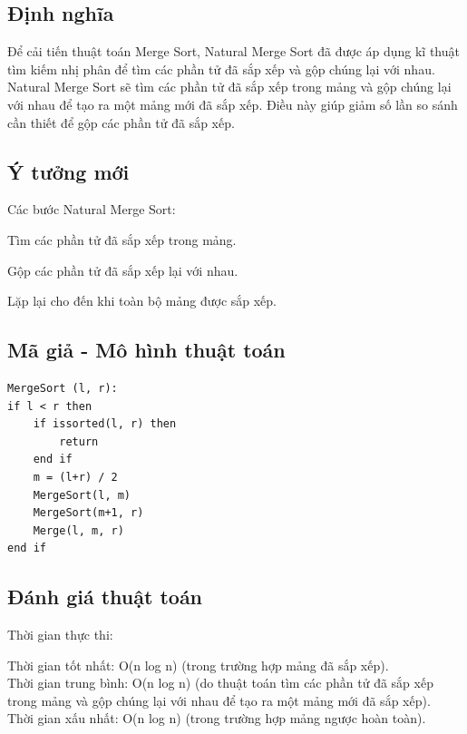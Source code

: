 \documentclass[12pt,a4paper]{report}
\begin{document}
\subsection{ Định nghĩa}

{\large \hspace{1cm} Để cải tiến thuật toán Merge Sort, Natural Merge Sort đã được áp dụng kĩ thuật tìm kiếm nhị phân để tìm các phần tử đã sắp xếp và gộp chúng lại với nhau. Natural Merge Sort sẽ tìm các phần tử đã sắp xếp trong mảng và gộp chúng lại với nhau để tạo ra một mảng mới đã sắp xếp. Điều này giúp giảm số lần so sánh cần thiết để gộp các phần tử đã sắp xếp.}

\subsection {Ý tưởng mới}

Các bước Natural Merge Sort:

Tìm các phần tử đã sắp xếp trong mảng.

Gộp các phần tử đã sắp xếp lại với nhau.

Lặp lại cho đến khi toàn bộ mảng được sắp xếp.

\subsection{ Mã giả - Mô hình thuật toán}

\begin{lstlisting}
MergeSort (l, r):
if l < r then
    if issorted(l, r) then
        return
    end if
    m = (l+r) / 2
    MergeSort(l, m)
    MergeSort(m+1, r)
    Merge(l, m, r)
end if
\end{lstlisting}

\subsection{ Đánh giá thuật toán}

{Thời gian thực thi:

\hspace{0.5cm} Thời gian tốt nhất: O(n log n) (trong trường hợp mảng đã sắp xếp).\\

\hspace{0.5cm} Thời gian trung bình: O(n log n) (do thuật toán tìm các phần tử đã sắp xếp trong mảng và gộp chúng lại với nhau để tạo ra một mảng mới đã sắp xếp).\\

\hspace{0.5cm} Thời gian xấu nhất: O(n log n) (trong trường hợp mảng ngược hoàn toàn).\\}
\end{document}
